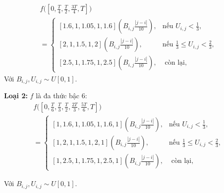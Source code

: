 \documentclass[../main.tex]{subfiles}
\begin{document}
\begin{multline*}
   f\big([0, \frac{T}{4}, \frac{T}{2}, \frac{3T}{4}, T]\big) \\
   =
   \begin{cases} 
    [1.6, 1, 1.05, 1, 1.6](B_{i,j} \frac{|j − i|}{10}), & \text {nếu } U_{i,j} < \frac{1}{3}, \\ 
    [2, 1, 1.5, 1, 2](B_{i,j} \frac{|j − i|}{10}), & \text {nếu } \frac{1}{3} \leq U_{i,j} < \frac{2}{3}, \\ 
    [2.5, 1, 1.75, 1, 2.5](B_{i,j} \frac{|j − i|}{10}), & \text{ còn lại},
    \end{cases}
\end{multline*}
    Với \(B_{i, j}, U_{i, j} \sim U[0, 1]\).

\textbf{Loại 2:} \(f\) là đa thức bậc $6$:
\begin{multline*}
    f\big([0, \frac{T}{6}, \frac{T}{3}, \frac{T}{2}, \frac{2T}{3}, \frac{5T}{6}, T]\big) \\
    = 
    \begin{cases} 
    [1, 1.6, 1, 1.05, 1, 1.6, 1](B_{i,j} \frac{|j − i|}{10}), & \text {nếu }  U_{i,j} < \frac{1}{3}, \\ 
    [1, 2, 1, 1.5, 1, 2, 1](B_{i,j} \frac{|j − i|}{10}), & \text {nếu } \frac{1}{3} \leq U_{i,j} < \frac{2}{3}, \\ 
    [1, 2.5, 1, 1.75, 1, 2.5, 1](B_{i,j} \frac{|j − i|}{10}), & \text{ còn lại},
    \end{cases}
\end{multline*}

Với \(B_{i, j}, U_{i, j} \sim U[0, 1]\).


\end{document}
